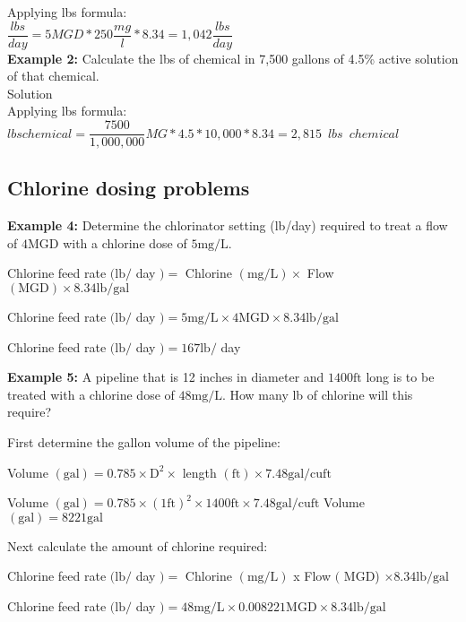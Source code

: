 Applying lbs formula:\\
$\dfrac{lbs}{day}=5 MGD *250\dfrac{mg}{l}*8.34 = \boxed{1,042\dfrac{lbs}{day}}$
\\
\vspace{6pt}
\textbf{Example 2:} Calculate the lbs of chemical in 7,500 gallons of 4.5\% active solution of that chemical.\\
Solution\\
Applying lbs formula:\\
$lbs chemical = \dfrac{7500}{1,000,000}MG * 4.5*10,000 *8.34 = \boxed{2,815 \enspace lbs \enspace chemical}$\\

\subsection{Chlorine dosing problems}
\textbf{Example 4:} Determine the chlorinator setting (lb/day) required to treat a flow of $4 \mathrm{MGD}$ with a chlorine dose of $5 \mathrm{mg} / \mathrm{L}$.

Chlorine feed rate $(\mathrm{lb} /$ day $)=$ Chlorine $(\mathrm{mg} / \mathrm{L}) \times$ Flow $(\mathrm{MGD}) \times 8.34 \mathrm{lb} / \mathrm{gal}$

Chlorine feed rate $(\mathrm{lb} /$ day $)=5 \mathrm{mg} / \mathrm{L} \times 4 \mathrm{MGD} \times 8.34 \mathrm{lb} / \mathrm{gal}$

Chlorine feed rate $(\mathrm{lb} /$ day $)=167 \mathrm{lb} /$ day

\textbf{Example 5:} A pipeline that is 12 inches in diameter and $1400 \mathrm{ft}$ long is to be treated with a chlorine dose of $48 \mathrm{mg} / \mathrm{L}$. How many lb of chlorine will this require?

First determine the gallon volume of the pipeline:

Volume $(\mathrm{gal})=0.785 \times \mathrm{D}^{2} \times$ length $(\mathrm{ft}) \times 7.48 \mathrm{gal} / \mathrm{cu} \mathrm{ft}$

Volume $(\mathrm{gal})=0.785 \times(1 \mathrm{ft})^{2} \times 1400 \mathrm{ft} \times 7.48 \mathrm{gal} / \mathrm{cu} \mathrm{ft}$ Volume $(\mathrm{gal})=8221 \mathrm{gal}$

Next calculate the amount of chlorine required:

Chlorine feed rate $(\mathrm{lb} /$ day $)=$ Chlorine $(\mathrm{mg} / \mathrm{L})$ x Flow $($ MGD) $\times 8.34 \mathrm{lb} / \mathrm{gal}$

Chlorine feed rate $(\mathrm{lb} /$ day $)=48 \mathrm{mg} / \mathrm{L} \times 0.008221 \mathrm{MGD} \times 8.34 \mathrm{lb} / \mathrm{gal}$

